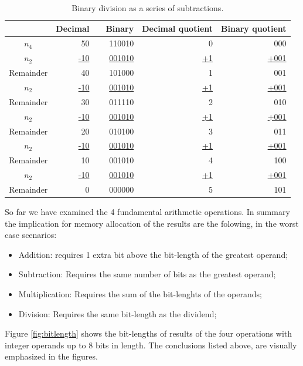 \documentclass[12pt]{article}
\begin{document}
\begin{table}[ht]
	\centering
    \caption{Binary division as a series of subtractions.}
    \begin{tabular}{crrrrr}
    \hline
    	  & Decimal & & Binary & Decimal quotient & Binary quotient\\
    \hline  
    $n_4$ & 50 					& & 110010
&0& 000 \\
    $n_2$ & \underline{-10} 	& & \underline{001010}  &\underline{+1}&
\underline{+001} \\
    Remainder & 40      			& & 101000
&1& 001
\\
    $n_2$ & \underline{-10} 	& & \underline{001010}  &\underline{+1}&
\underline{+001} \\
    Remainder & 30      			& & 011110
&2& 010
\\
    $n_2$ & \underline{-10} 	& & \underline{001010}  &\underline{+1}&
\underline{+001} \\
    Remainder & 20      			& & 010100
&3& 011
\\
    $n_2$ & \underline{-10} 	& & \underline{001010}  &\underline{+1}&
\underline{+001} \\
    Remainder & 10      			& & 001010
&4& 100
\\
    $n_2$ & \underline{-10} 	& & \underline{001010}  &\underline{+1}&
\underline{+001} \\
    Remainder & 0      				& & 000000
&5& 101 \\
    \hline
	\end{tabular}
    \label{tab:07}
\end{table}

So far we have examined the 4 fundamental arithmetic operations. In summary the
implication for memory allocation of the results are the folowing, in the worst
case scenarios:

\begin{itemize}
\item Addition: requires 1 extra bit above the bit-length of the greatest
operand;
\item Subtraction: Requires the same number of bits as the greatest
operand;
\item Multiplication: Requires the sum of the bit-lenghts of the
operands;
\item Division: Requires the same bit-length as the dividend;
\end{itemize}

Figure \ref{fig:bitlength} shows the bit-lengths of results of the four
operations with integer operands up to 8 bits in length. The conclusions listed
above, are visually emphasized in the figures.
\end{document}
